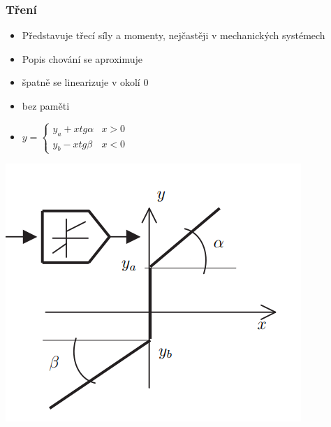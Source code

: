 \subsubsection*{Tření}
\begin{itemize}
    \item Představuje třecí síly a momenty, nejčastěji v mechanických systémech
    \item Popis chování se aproximuje
    \item špatně se linearizuje v okolí 0
    \item bez paměti
    \item \(y = \begin{cases}
              y_a + xtg\alpha & x > 0 \\
              y_b - xtg\beta  & x < 0
          \end{cases}\)
\end{itemize}
\includegraphics{img/treni.png}

